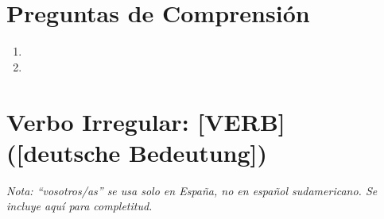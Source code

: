 \documentclass[12pt,a4paper]{article}
\begin{document}
\section*{Preguntas de Comprensión}

\begin{enumerate}[leftmargin=*]
    \item [Frage 1]
    \item [Frage 2]
\end{enumerate}

\newpage

\section*{Verbo Irregular: [VERB] ([deutsche Bedeutung])}

\textit{Nota: \enquote{vosotros/as} se usa solo en España, no en español sudamericano. Se incluye aquí para completitud.}
\end{document}
